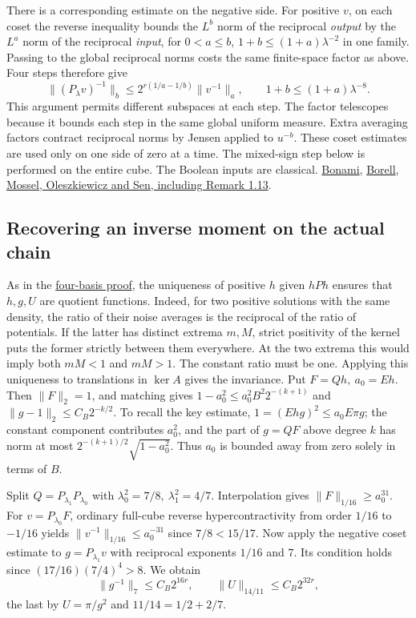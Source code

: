 \documentclass[11pt]{article}
\begin{document}
There is a corresponding estimate on the negative side. For positive \(v\), on each coset the reverse inequality bounds the \(L^{b}\) norm of the reciprocal \emph{output} by the \(L^{a}\) norm of the reciprocal \emph{input}, for \(0<a\le b\), \(1+b\le(1+a)\lambda^{-2}\) in one family. Passing to the global reciprocal norms costs the same finite-space factor as above. Four steps therefore give
\[
 \|(P_\lambda v)^{-1}\|_b\le
 2^{r(1/a-1/b)}\|v^{-1}\|_a,\qquad
 1+b\le(1+a)\lambda^{-8}.
\]
This argument permits different subspaces at each step. The factor telescopes because it bounds each step in the same global uniform measure. Extra averaging factors contract reciprocal norms by Jensen applied to \(u^{-b}\). These coset estimates are used only on one side of zero at a time. The mixed-sign step below is performed on the entire cube. The Boolean inputs are classical. \href{https://www.numdam.org/articles/10.5802/aif.357/}{Bonami}, \href{https://doi.org/10.1007/BF01318906}{Borell}, \href{https://arxiv.org/pdf/1108.1210}{Mossel, Oleszkiewicz and Sen, including Remark 1.13}.

\subsection{Recovering an inverse moment on the actual chain}

As in the \href{https://github.com/lluiseriksson/THE-ERIKSSON-PROGRAMME/blob/9b92c977ee4bf401548f28d7dc13ea7392ece8ea/papers/stationary-weighting354/research/2026-11-18-small-support/QUOTIENT-SPECTRAL-RECOVERY.md}{four-basis proof}, the uniqueness of positive \(h\) given \(hPh\) ensures that \(h,g,U\) are quotient functions. Indeed, for two positive solutions with the same density, the ratio of their noise averages is the reciprocal of the ratio of potentials. If the latter has distinct extrema \(m,M\), strict positivity of the kernel puts the former strictly between them everywhere. At the two extrema this would imply both \(mM<1\) and \(mM>1\). The constant ratio must be one. Applying this uniqueness to translations in \(\ker A\) gives the invariance. Put \(F=Qh,\ a_0=Eh\). Then \(\|F\|_2=1\), and matching gives \(1-a_0^2\le a_0^2 B^2 2^{-(k+1)}\) and \(\|g-1\|_2\le C_B2^{-k/2}\). To recall the key estimate, \(1=(Ehg)^2\le a_0 E\pi g\); the constant component contributes \(a_0^2\), and the part of \(g=QF\) above degree \(k\) has norm at most \(2^{-(k+1)/2}\sqrt{1-a_0^2}\). Thus \(a_0\) is bounded away from zero solely in terms of \(B\).

Split \(Q=P_{\lambda_1}P_{\lambda_0}\) with \(\lambda_0^2=7/8,\ \lambda_1^2=4/7\). Interpolation gives \(\|F\|_{1/16}\ge a_0^{31}\). For \(v=P_{\lambda_0}F\), ordinary full-cube reverse hypercontractivity from order \(1/16\) to \(-1/16\) yields \(\|v^{-1}\|_{1/16}\le a_0^{-31}\) since \(7/8<15/17\). Now apply the negative coset estimate to \(g=P_{\lambda_1}v\) with reciprocal exponents \(1/16\) and \(7\). Its condition holds since \((17/16)(7/4)^4>8\). We obtain
\[
 \|g^{-1}\|_7\le C_B2^{16r},\qquad
 \|U\|_{14/11}\le C_B2^{32r},
\]
the last by \(U=\pi/g^2\) and \(11/14=1/2+2/7\).
\end{document}
